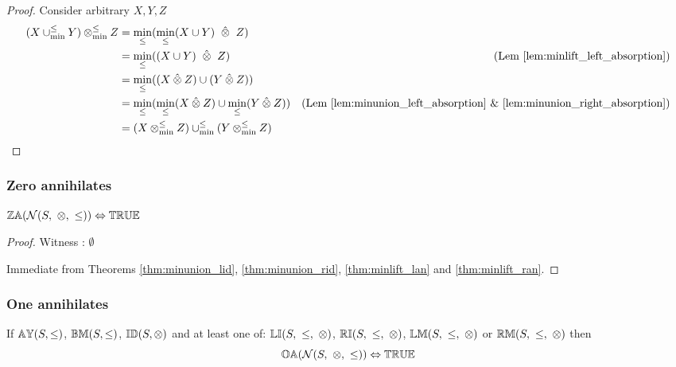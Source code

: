 \documentclass[../Summary.tex]{subfiles}
\begin{document}
\begin{proof}

\vspace{0.5em}
Consider arbitrary $X,Y,Z$
\begin{align*}
(X \minunion Y) \minlift Z 	& = \min_\leq(\min_\leq(X \cup Y) \ \lift \ Z) \\
							& = \min_\leq((X \cup Y) \ \lift \ Z) & \text{(Lem \ref{lem:minlift_left_absorption})}\\
							& = \min_\leq((X \lift Z) \cup (Y \lift Z)) \\
							& = \min_\leq(\min_\leq(X \lift Z) \cup \min_\leq(Y \lift Z)) & \text{(Lem \ref{lem:minunion_left_absorption} \& \ref{lem:minunion_right_absorption})} \\
							& = (X \minlift Z) \minunion (Y \minlift Z)
\end{align*}
\end{proof}





\subsubsection{Zero annihilates}

\begin{theorem} \label{thm:N_zo}
${\mathbb{ZA}}(\mathcal{N}(S,\ \otimes,\ \leq)) \Leftrightarrow {\mathbb{TRUE}}$
\end{theorem}

\begin{proof}

\vspace{0.5em}
Witness : $\emptyset$

\vspace{0.5em}
Immediate from Theorems \ref{thm:minunion_lid}, \ref{thm:minunion_rid}, \ref{thm:minlift_lan} and \ref{thm:minlift_ran}.
\end{proof}





\subsubsection{One annihilates}

\begin{theorem} \label{thm:N_oa}
If ${\mathbb{AY}}(S,\leq)$, ${\mathbb{BM}}(S,\leq)$, ${\mathbb{ID}}(S,\otimes)$ and at least one of: $\propname{LI}(S,\ \leq,\ \otimes)$, $\propname{RI}(S,\ \leq,\ \otimes)$, $\propname{LM}(S,\ \leq,\ \otimes)$ or $\propname{RM}(S,\ \leq,\ \otimes)$ then
\begin{equation*}
{\mathbb{OA}}(\mathcal{N}(S,\ \otimes,\ \leq)) \Leftrightarrow {\mathbb{TRUE}}
\end{equation*}
\end{theorem}
\end{document}
